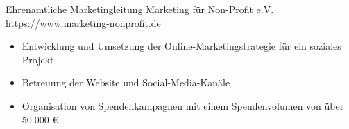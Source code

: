 \documentclass[a4paper, serif, 10pt]{moderncv}
\begin{document}
        {Ehrenamtliche Marketingleitung}
        {Marketing für Non-Profit e.V.}
        {\url{https://www.marketing-nonprofit.de}}
        {}
        {\begin{itemize}
\item Entwicklung und Umsetzung der Online-Marketingstrategie für ein soziales Projekt
\item Betreuung der Website und Social-Media-Kanäle
\item Organisation von Spendenkampagnen mit einem Spendenvolumen von über 50.000 €
\end{itemize}}
    
\end{document}
